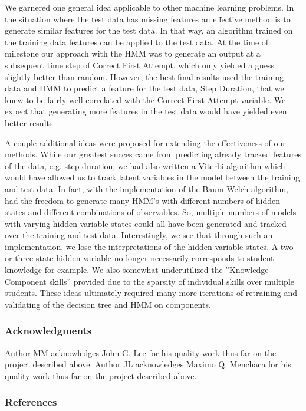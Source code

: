 \documentclass{article} %
\begin{document}
We garnered one general idea applicable to other machine learning problems. In the situation where the test data has missing features an effective method is to generate similar features for the test data. In that way, an algorithm trained on the training data features can be applied to the test data. At the time of milestone our approach with the HMM was to generate an output at a subsequent time step of Correct First Attempt, which only yielded a guess slightly better than random. However, the best final results used the training data and HMM to predict a feature for the test data, Step Duration, that we knew to be fairly well correlated with the Correct First Attempt variable. We expect that generating more features in the test data would have yielded even better results. 

A couple additional ideas were proposed for extending the effectiveness of our methods. While our greatest succes came from predicting already tracked features of the data, e.g. step duration, we had also written a Viterbi algorithm which would have allowed us to track latent variables in the model between the training and test data. In fact, with the implementation of the Baum-Welch algorithm, had the freedom to generate many HMM's with different numbers of hidden states and  different combinations of observables. So, multiple numbers of models with varying hidden variable states could all have been generated and tracked over the training and test data. Interestingly, we see that through such an implementation, we lose the interpretations of the hidden variable states. A two or three state hidden variable no longer necessarily corresponds to student knowledge for example. We also somewhat underutilized the ''Knowledge Component skills'' provided due to the sparsity of individual skills over multiple students. These ideas ultimately required many more iterations of retraining and validating of the decision tree and HMM on components.


\subsubsection*{Acknowledgments}

Author MM acknowledges John G. Lee for his quality work thus far on the project described above. Author JL acknowledges Maximo Q. Menchaca for his quality work thus far on the project described above.

\subsubsection*{References}
\end{document}
